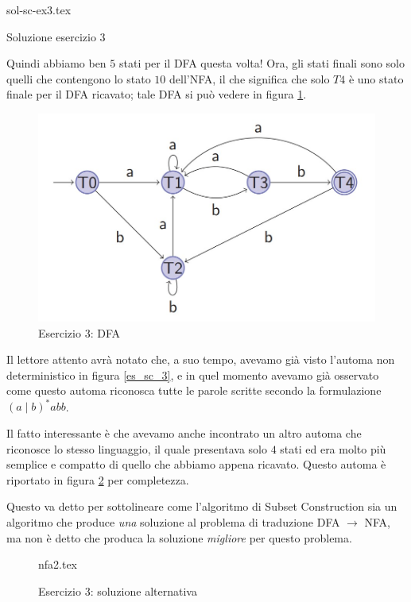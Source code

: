 \documentclass[class=book, crop=false, oneside, 12pt]{standalone}
\begin{document}
\begin{table}[H]
	\centering
	{sol-sc-ex3.tex}
    \caption{Soluzione esercizio 3}
    \label{sol-sc-ex3}
\end{table}

Quindi abbiamo ben \(5\) stati per il DFA questa volta! Ora, gli stati finali sono solo quelli che contengono lo stato \(10\) dell'NFA, il che significa che solo \(T4\) è uno stato finale per il DFA ricavato; tale DFA si può vedere in figura \ref{sol_sc_3}.
\begin{figure}[H]
    \centering
    \includegraphics[width=.8\textwidth,keepaspectratio]{s3_subset_construction.jpg}
    \caption{Esercizio 3: DFA}
    \label{sol_sc_3}
\end{figure}

Il lettore attento avrà notato che, a suo tempo, avevamo già visto l'automa non deterministico in figura \ref{es_sc_3}, e in quel momento avevamo già osservato come questo automa riconosca tutte le parole scritte secondo la formulazione \((a \mid b)^* abb\).

Il fatto interessante è che avevamo anche incontrato un altro automa che riconosce lo stesso linguaggio, il quale presentava solo \(4\) stati ed era molto più semplice e compatto di quello che abbiamo appena ricavato. Questo automa è riportato in figura \ref{sol_sc_3_v2} per completezza.

Questo va detto per sottolineare come l'algoritmo di Subset Construction sia un algoritmo che produce \emph{una} soluzione al problema di traduzione DFA \(\to\) NFA, ma non è detto che produca la soluzione \emph{migliore} per questo problema.

\begin{figure}[htb]
    \centering
    {nfa2.tex}
    \caption{Esercizio 3: soluzione alternativa}
    \label{sol_sc_3_v2}
\end{figure}
\end{document}
